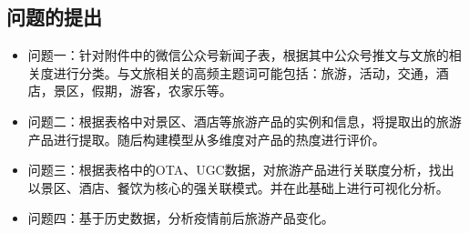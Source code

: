 \documentclass[bwprint]{gmcmthesis}
\begin{document}
\subsection{问题的提出}

\begin{itemize}
	\item 问题一：针对附件中的微信公众号新闻子表，根据其中公众号推文与文旅的相关度进行分类。与文旅相关的高频主题词可能包括：旅游，活动，交通，酒店，景区，假期，游客，农家乐等。
 
	\item 问题二：根据表格中对景区、酒店等旅游产品的实例和信息，将提取出的旅游产品进行提取。随后构建模型从多维度对产品的热度进行评价。
 
	\item 问题三：根据表格中的OTA、UGC数据，对旅游产品进行关联度分析，找出以景区、酒店、餐饮为核心的强关联模式。并在此基础上进行可视化分析。
 
	\item 问题四：基于历史数据，分析疫情前后旅游产品变化。
\end{itemize}





\end{document}
